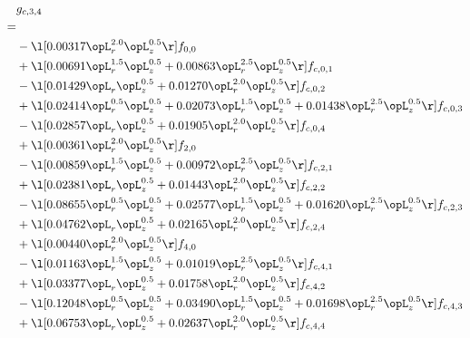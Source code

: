 \begin{alignat}{2} 
\label{eq:g_34_0} 
& g_{c,3,4} \nonumber \\ 
 = \\ 
& - \l[  0.00317 \opL_r^{2.0} \opL_z^{0.5}  \r] f_{0,0} \nonumber \\ 
& + \l[  0.00691 \opL_r^{1.5} \opL_z^{0.5} +  0.00863 \opL_r^{2.5} \opL_z^{0.5}  \r] f_{c,0,1} \nonumber \\ 
& - \l[  0.01429 \opL_r \opL_z^{0.5} +  0.01270 \opL_r^{2.0} \opL_z^{0.5}  \r] f_{c,0,2} \nonumber \\ 
& + \l[  0.02414 \opL_r^{0.5} \opL_z^{0.5} +  0.02073 \opL_r^{1.5} \opL_z^{0.5} +  0.01438 \opL_r^{2.5} \opL_z^{0.5}  \r] f_{c,0,3} \nonumber \\ 
& - \l[  0.02857 \opL_r \opL_z^{0.5} +  0.01905 \opL_r^{2.0} \opL_z^{0.5}  \r] f_{c,0,4} \nonumber \\ 
& + \l[  0.00361 \opL_r^{2.0} \opL_z^{0.5}  \r] f_{2,0} \nonumber \\ 
& - \l[  0.00859 \opL_r^{1.5} \opL_z^{0.5} +  0.00972 \opL_r^{2.5} \opL_z^{0.5}  \r] f_{c,2,1} \nonumber \\ 
& + \l[  0.02381 \opL_r \opL_z^{0.5} +  0.01443 \opL_r^{2.0} \opL_z^{0.5}  \r] f_{c,2,2} \nonumber \\ 
& - \l[  0.08655 \opL_r^{0.5} \opL_z^{0.5} +  0.02577 \opL_r^{1.5} \opL_z^{0.5} +  0.01620 \opL_r^{2.5} \opL_z^{0.5}  \r] f_{c,2,3} \nonumber \\ 
& + \l[  0.04762 \opL_r \opL_z^{0.5} +  0.02165 \opL_r^{2.0} \opL_z^{0.5}  \r] f_{c,2,4} \nonumber \\ 
& + \l[  0.00440 \opL_r^{2.0} \opL_z^{0.5}  \r] f_{4,0} \nonumber \\ 
& - \l[  0.01163 \opL_r^{1.5} \opL_z^{0.5} +  0.01019 \opL_r^{2.5} \opL_z^{0.5}  \r] f_{c,4,1} \nonumber \\ 
& + \l[  0.03377 \opL_r \opL_z^{0.5} +  0.01758 \opL_r^{2.0} \opL_z^{0.5}  \r] f_{c,4,2} \nonumber \\ 
& - \l[  0.12048 \opL_r^{0.5} \opL_z^{0.5} +  0.03490 \opL_r^{1.5} \opL_z^{0.5} +  0.01698 \opL_r^{2.5} \opL_z^{0.5}  \r] f_{c,4,3} \nonumber \\ 
& + \l[  0.06753 \opL_r \opL_z^{0.5} +  0.02637 \opL_r^{2.0} \opL_z^{0.5}  \r] f_{c,4,4} \nonumber \\ 
\end{alignat} 


